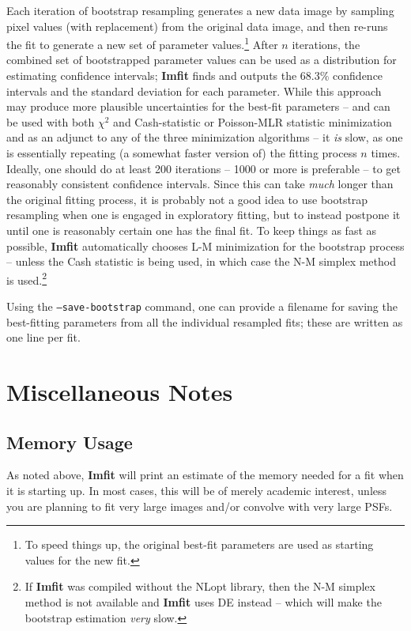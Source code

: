 \documentclass[10pt,a4paper,article]{memoir}
\newcommand{\imfit}{\textbf{Imfit}}
\newcommand{\chisquare}{\ensuremath{\chi^{2}}}
\begin{document}
Each iteration of bootstrap resampling generates a new data image by
sampling pixel values (with replacement) from the original data image,
and then re-runs the fit to generate a new set of parameter
values.\footnote{To speed things up, the original best-fit parameters
are used as starting values for the new fit.} After $n$ iterations, the
combined set of bootstrapped parameter values can be used as a
distribution for estimating confidence intervals; \imfit{} finds and
outputs the 68.3\% confidence intervals and the standard deviation for
each parameter. While this approach may produce more plausible
uncertainties for the best-fit parameters -- and can be used with both
\chisquare{} and Cash-statistic or Poisson-MLR statistic minimization
and as an adjunct to any of the three minimization algorithms -- it
\textit{is} slow, as one is essentially repeating (a somewhat faster
version of) the fitting process $n$ times. Ideally, one should do at
least 200 iterations -- 1000 or more is preferable -- to get reasonably
consistent confidence intervals. Since this can take \textit{much}
longer than the original fitting process, it is probably not a good idea
to use bootstrap resampling when one is engaged in exploratory fitting,
but to instead postpone it until one is reasonably certain one has the
final fit. To keep things as fast as possible, \imfit{} automatically
chooses L-M minimization for the bootstrap process -- unless the
Cash statistic is being used, in which case the N-M simplex
method is used.\footnote{If \imfit{} was compiled without the NLopt
library, then the N-M simplex method is not available and \imfit{} uses
DE instead -- which will make the bootstrap estimation \textit{very}
slow.}

Using the \texttt{--save-bootstrap} command, one can provide a filename
for saving the best-fitting parameters from all the individual resampled
fits; these are written as one line per fit.



\chapter{Miscellaneous Notes}

\section{Memory Usage}

As noted above, \imfit{} will print an estimate of the memory needed for a fit
when it is starting up. In most cases, this will be of merely academic interest,
unless you are planning to fit very large images and/or convolve with very large PSFs.
\end{document}
